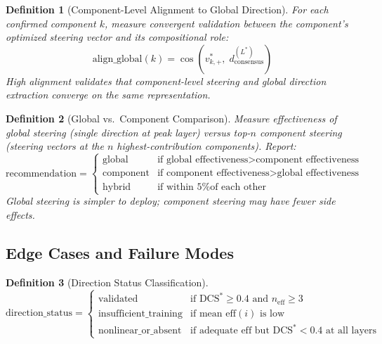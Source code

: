 \documentclass[11pt]{article}
\newtheorem{definition}{Definition}[section]
\begin{document}
\begin{definition}[Component-Level Alignment to Global Direction]
\label{def:component-global-alignment}
For each confirmed component $k$, measure convergent validation between the component's optimized steering vector and its compositional role:
\begin{equation}
\text{align\_global}(k) = \cos(v^*_{k,+},\; d^{(L^*)}_{\text{consensus}})
\end{equation}
High alignment validates that component-level steering and global direction extraction converge on the same representation.
\end{definition}

\begin{definition}[Global vs.\ Component Comparison]
\label{def:global-vs-component}
Measure effectiveness of global steering (single direction at peak layer) versus top-$n$ component steering (steering vectors at the $n$ highest-contribution components). Report:
\begin{equation}
\text{recommendation} = \begin{cases}
\text{global} & \text{if global effectiveness} > \text{component effectiveness} \\
\text{component} & \text{if component effectiveness} > \text{global effectiveness} \\
\text{hybrid} & \text{if within 5\% of each other}
\end{cases}
\end{equation}
Global steering is simpler to deploy; component steering may have fewer side effects.
\end{definition}

\subsection{Edge Cases and Failure Modes}
\label{app:direction-edge-cases}

\begin{definition}[Direction Status Classification]
\label{def:direction-status}
\begin{equation}
\text{direction\_status} = \begin{cases}
\text{validated} & \text{if DCS}^* \geq 0.4 \text{ and } n_{\text{eff}} \geq 3 \\
\text{insufficient\_training} & \text{if mean eff}(i) \text{ is low} \\
\text{nonlinear\_or\_absent} & \text{if adequate eff but DCS}^* < 0.4 \text{ at all layers}
\end{cases}
\end{equation}
\end{definition}
\end{document}

